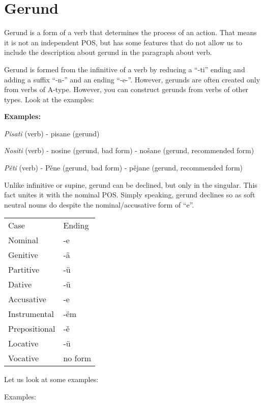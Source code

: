 \section{Gerund}

Gerund is a form of a verb that determines the process of an action. That means it is not an independent POS, but has some features that do not allow us to include the description about gerund in the paragraph about verb.

Gerund is formed from the infinitive of a verb by reducing a “-ti” ending and adding a suffix “-n-” and an ending “-e-”. However, gerunds are often created only from verbs of A-type. However, you can construct gerunds from verbs of other types. Look at the examples:

\textbf{Examples:}

\textit{Pisati} (verb) - pisane (gerund)

\textit{Nositi} (verb) - nosine (gerund, bad form) - nošane (gerund, recommended form)

\textit{Pěti} (verb) - Pěne (gerund, bad form) - pějane (gerund, recommended form)

Unlike infinitive or supine, gerund can be declined, but only in the singular. This fact unites it with the nominal POS. Simply speaking, gerund declines so as soft neutral nouns do despite the nominal/accusative form of “e”.

\begin{table}
	\begin{tabular}{ll}
	Case & Ending \\
	Nominal & -e \\
	Genitive & -ä \\
	Partitive & -ü \\
	Dative & -ü \\
	Accusative & -e \\
	Instrumental & -ëm \\
	Prepositional & -ě \\
	Locative & -ü \\
	Vocative & no form
	\end{tabular}
\end{table}

Let us look at some examples:

Examples:


